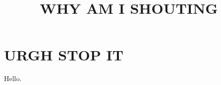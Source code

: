 \documentclass{article}
\title{WHY AM I SHOUTING}
\begin{document}
  \maketitle
  \section{URGH STOP IT}
  Hello.
\end{document}
